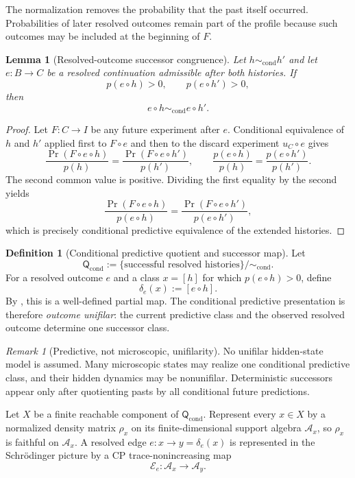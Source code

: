 \documentclass[11pt]{article}
\newtheorem{lemma}[theorem]{Lemma}
\theoremstyle{definition}
\newtheorem{definition}[theorem]{Definition}
\theoremstyle{remark}
\newtheorem{remark}[theorem]{Remark}
\newcommand{\A}{\mathcal A}
\newcommand{\E}{\mathcal E}
\newcommand{\Qq}{\mathsf Q}
\begin{document}
The normalization removes the probability that the past itself occurred.
Probabilities of later resolved outcomes remain part of the profile because
such outcomes may be included at the beginning of $F$.

\begin{lemma}[Resolved-outcome successor congruence]
\label{lem:conditional-successor}
Let $h\sim_{\mathrm{cond}}h'$ and let $e:B\to C$ be a resolved continuation
admissible after both histories.  If
\[
 p(e\circ h)>0,\qquad p(e\circ h')>0,
\]
then
\[
 e\circ h\sim_{\mathrm{cond}}e\circ h'.
\]
\end{lemma}

\begin{proof}
Let $F:C\to I$ be any future experiment after $e$.  Conditional equivalence of
$h$ and $h'$ applied first to $F\circ e$ and then to the discard experiment
$u_C\circ e$ gives
\[
 \frac{\Pr(F\circ e\circ h)}{p(h)}
 =
 \frac{\Pr(F\circ e\circ h')}{p(h')},
 \qquad
 \frac{p(e\circ h)}{p(h)}
 =
 \frac{p(e\circ h')}{p(h')}.
\]
The second common value is positive.  Dividing the first equality by the
second yields
\[
 \frac{\Pr(F\circ e\circ h)}{p(e\circ h)}
 =
 \frac{\Pr(F\circ e\circ h')}{p(e\circ h')},
\]
which is precisely conditional predictive equivalence of the extended
histories.
\end{proof}

\begin{definition}[Conditional predictive quotient and successor map]
\label{def:conditional-predictive-quotient}
Let
\[
 \Qq_{\mathrm{cond}}
 :=
 \{\text{successful resolved histories}\}/\!\sim_{\mathrm{cond}}.
\]
For a resolved outcome $e$ and a class $x=[h]$ for which
$p(e\circ h)>0$, define
\[
 \delta_e(x):=[e\circ h].
\]
By , this is a well-defined partial map.  The
conditional predictive presentation is therefore \emph{outcome unifilar}: the
current predictive class and the observed resolved outcome determine one
successor class.
\end{definition}

\begin{remark}[Predictive, not microscopic, unifilarity]
No unifilar hidden-state model is assumed.  Many microscopic states may realize
one conditional predictive class, and their hidden dynamics may be
nonunifilar.  Deterministic successors appear only after quotienting pasts by
all conditional future predictions.
\end{remark}

Let $X$ be a finite reachable component of
$\Qq_{\mathrm{cond}}$.  Represent every $x\in X$ by a normalized density
matrix $\rho_x$ on its finite-dimensional support algebra $\A_x$, so
$\rho_x$ is faithful on $\A_x$.  A resolved
edge $e:x\to y=\delta_e(x)$ is represented in the Schr\"odinger picture by a
CP trace-nonincreasing map
\[
 \E_e:\A_x\longrightarrow\A_y.
\]
\end{document}
